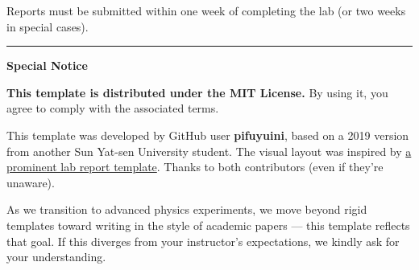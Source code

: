 {	Reports must be submitted within one week of completing the lab (or two weeks in special cases).
	
	\noindent\textcolor{StructureColor}{\rule{\textwidth}{1.5pt} }
	
	\noindent\textcolor{StructureColor}{\textbf{Special Notice}}
	
	\textbf{This template is distributed under the MIT License.} By using it, you agree to comply with the associated terms.
	
	This template was developed by GitHub user \textbf{pifuyuini}, based on a 2019 version from another Sun Yat-sen University student. The visual layout was inspired by \href{https://www.yykspace.com/cn/index.html}{a prominent lab report template}. Thanks to both contributors (even if they’re unaware).
	
	As we transition to advanced physics experiments, we move beyond rigid templates toward writing in the style of academic papers — this template reflects that goal. If this diverges from your instructor's expectations, we kindly ask for your understanding.
}

\newcommand{\YsyEmph}[1]{
	\textbf{\textcolor{EmphColor}{#1}}
}



\newcommand{\tensor}[3]{#1^{\mathrm{#2}}_{\phantom{#2}\mathrm{#3}}} %

\newcommand{\Diff}{\mathrm{d}} %
\newcommand{\Der}[2]{\dfrac{\mathrm{d}#1}{\mathrm{d}#2}} %
\newcommand{\EulerE}{\mathrm{e}} %
\newcommand{\ImgI}{\mathrm{i}} %
\newcommand{\DV}[2]{#1_{\mathrm{#2}}} %
\newcommand{\LA}[1]{\boldsymbol{#1}} %
